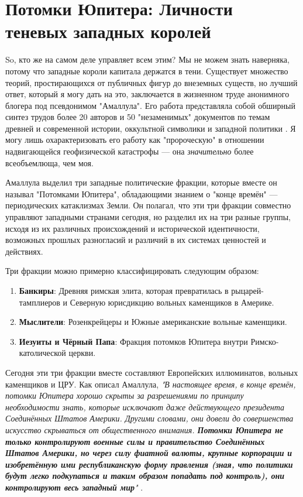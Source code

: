 \documentclass[10pt,twocolumn,letterpaper]{article}
\begin{document}
\section{Потомки Юпитера: Личности теневых западных королей}
So, кто же на самом деле управляет всем этим? Мы не можем знать наверняка, потому что западные короли капитала держатся в тени. Существует множество теорий, простирающихся от публичных фигур до внеземных существ, но лучший ответ, который я могу дать на это, заключается в жизненном труде анонимного блогера под псевдонимом "Амаллула". Его работа представляла собой обширный синтез трудов более 20 авторов и 50 "незаменимых" документов по темам древней и современной истории, оккультной символики и западной политики \cite{33,34}. Я могу лишь охарактеризовать его работу как "пророческую" в отношении надвигающейся геофизической катастрофы — она \textit{значительно} более всеобъемлюща, чем моя.

Амаллула выделил три западные политические фракции, которые вместе он называл "Потомками Юпитера", обладающими знанием о "конце времён" — периодических катаклизмах Земли. Он полагал, что эти три фракции совместно управляют западными странами сегодня, но разделил их на три разные группы, исходя из их различных происхождений и исторической идентичности, возможных прошлых разногласий и различий в их системах ценностей и действиях.

Три фракции можно примерно классифицировать следующим образом:

\begin{flushleft}
\begin{enumerate}
    \item \textbf{Банкиры}: Древняя римская элита, которая превратилась в рыцарей-тамплиеров и Северную юрисдикцию вольных каменщиков в Америке.
    \item \textbf{Мыслители}: Розенкрейцеры и Южные американские вольные каменщики.
    \item \textbf{Иезуиты и Чёрный Папа}: Фракция потомков Юпитера внутри Римско-католической церкви.
\end{enumerate}
\end{flushleft}

Сегодня эти три фракции вместе составляют Европейских иллюминатов, вольных каменщиков и ЦРУ. Как описал Амаллула, \textit{"В настоящее время, в конце времён, потомки Юпитера хорошо скрыты за разрешениями по принципу необходимости знать, которые исключают даже действующего президента Соединённых Штатов Америки. Другими словами, они довели до совершенства искусство скрываться от общественного внимания. \textbf{Потомки Юпитера не только контролируют военные силы и правительство Соединённых Штатов Америки, но через силу фиатной валюты, крупные корпорации и изобретённую ими республиканскую форму правления (зная, что политики будут легко подкупаться и таким образом попадать под контроль), они контролируют весь западный мир}"} \cite{33,34}.
\end{document}
